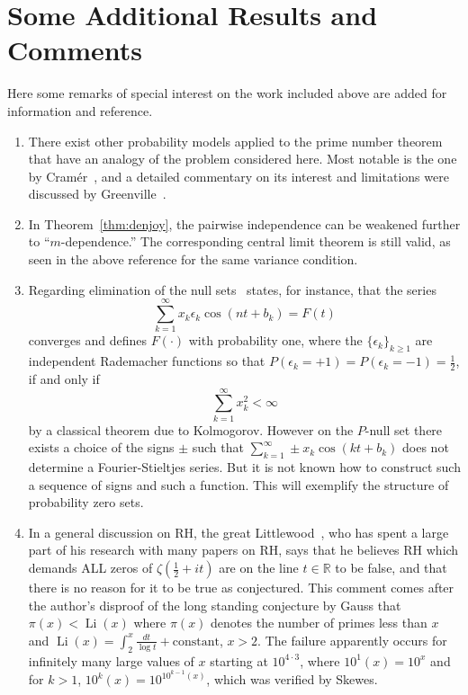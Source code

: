 \documentclass[11pt]{article}
\begin{document}
\section{Some Additional Results and Comments}
\label{sec:comments}

Here some remarks of special interest on the work included above are added for information and reference.

\begin{enumerate}
\item There exist other probability models applied to the prime number theorem that have an analogy of the problem considered here. Most notable is the one by Cramér~\cite{cramer}, and a detailed commentary on its interest and limitations were discussed by Greenville~\cite{grenville}.

\item In Theorem~\ref{thm:denjoy}, the pairwise independence can be weakened further to ``$m$-dependence.'' The corresponding central limit theorem is still valid, as seen in the above reference for the same variance condition.

\item Regarding elimination of the null sets~\cite{kahane} states, for instance, that the series
\begin{equation}
\label{eq:random_series}
\sum_{k=1}^\infty x_k \epsilon_k \cos(nt + b_k) = F(t)
\end{equation}
converges and defines $F(\cdot)$ with probability one, where the $\{\epsilon_k\}_{k \geq 1}$ are independent Rademacher functions so that $P(\epsilon_k = +1) = P(\epsilon_k = -1) = \frac{1}{2}$, if and only if
\begin{equation}
\label{eq:convergence_condition}
\sum_{k=1}^\infty x_k^2 < \infty
\end{equation}
by a classical theorem due to Kolmogorov. However on the $P$-null set there exists a choice of the signs $\pm$ such that $\sum_{k=1}^\infty \pm x_k \cos(kt + b_k)$ does not determine a Fourier-Stieltjes series. But it is not known how to construct such a sequence of signs and such a function. This will exemplify the structure of probability zero sets.

\item In a general discussion on RH, the great Littlewood~\cite{littlewood1962}, who has spent a large part of his research with many papers on RH, says that he believes RH which demands ALL zeros of $\zeta(\frac{1}{2} + it)$ are on the line $t \in \mathbb{R}$ to be false, and that there is no reason for it to be true as conjectured. This comment comes after the author's disproof of the long standing conjecture by Gauss that $\pi(x) < \operatorname{Li}(x)$ where $\pi(x)$ denotes the number of primes less than $x$ and $\operatorname{Li}(x) = \int_2^x \frac{dt}{\log t} + \text{constant}$, $x > 2$. The failure apparently occurs for infinitely many large values of $x$ starting at $10^{4 \cdot 3}$, where $10^1(x) = 10^x$ and for $k > 1$, $10^k(x) = 10^{10^{k-1}(x)}$, which was verified by Skewes.


\end{enumerate}
\end{document}
